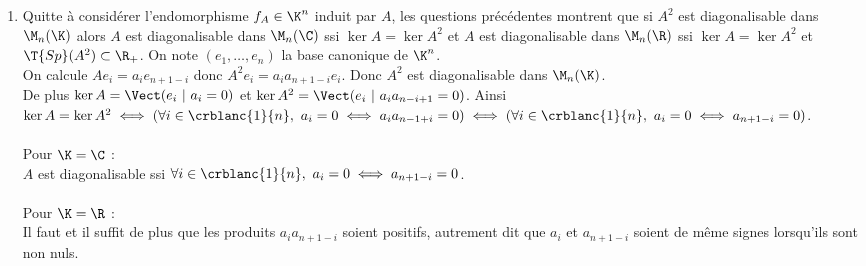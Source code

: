 \documentclass[8pt]{book}
\begin{document}
\begin{enumerate}[leftmargin=*]
		\item Quitte à considérer l'endomorphisme $f_A\in \K^n$ induit par $A$, les questions précédentes montrent que si $A^2$ est diagonalisable dans $\M_n(\K)$ alors $A$ est diagonalisable dans $\M_n(\C)$ ssi $\ker A=\ker A^2$ et $A$ est diagonalisable dans $\M_n(\R)$ ssi $\ker A=\ker A^2$ et $\T{Sp}(A^2)\subset \R_+$. On note $(e_1,\dots,e_n)$ la base canonique de $\K^n$.\\
		On calcule $Ae_i=a_ie_{n+1-i}$ donc $A^2e_i=a_ia_{n+1-i}e_i$. Donc $A^2$ est diagonalisable dans $\M_n(\K)$.\\
		De plus $\ker A=\Vect(e_i\ |\ a_i=0)$ et $\ker A^2=\Vect(e_i\ |\ a_ia_{n-i+1}=0)$. Ainsi $\ker A=\ker A^2\iff (\forall i\in \crblanc{1}{n},\ a_i=0\iff a_ia_{n-1+i}=0)\iff (\forall i\in \crblanc{1}{n},\ a_i=0\iff a_{n+1-i}=0)$.\\\\
		Pour $\K=\C$ :\\
		$A$ est diagonalisable ssi $\forall i\in \crblanc{1}{n},\ a_i=0\iff a_{n+1-i}=0$.\\\\
		Pour $\K=\R$ :\\
		Il faut et il suffit de plus que les produits $a_ia_{n+1-i}$ soient positifs, autrement dit que $a_i$ et $a_{n+1-i}$ soient de même signes lorsqu'ils sont non nuls.
	\end{enumerate}
	
\end{document}
